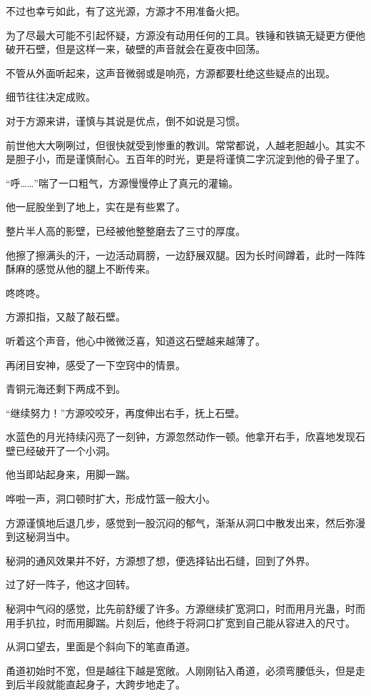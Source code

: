 \begin{this_body}
不过也幸亏如此，有了这光源，方源才不用准备火把。

为了尽最大可能不引起怀疑，方源没有动用任何的工具。铁锤和铁镐无疑更方便他破开石壁，但是这样一来，破壁的声音就会在夏夜中回荡。

不管从外面听起来，这声音微弱或是响亮，方源都要杜绝这些疑点的出现。

细节往往决定成败。

对于方源来讲，谨慎与其说是优点，倒不如说是习惯。

前世他大大咧咧过，但很快就受到惨重的教训。常常都说，人越老胆越小。其实不是胆子小，而是谨慎耐心。五百年的时光，更是将谨慎二字沉淀到他的骨子里了。

“呼……”喘了一口粗气，方源慢慢停止了真元的灌输。

他一屁股坐到了地上，实在是有些累了。

整片半人高的影壁，已经被他整整磨去了三寸的厚度。

他擦了擦满头的汗，一边活动肩膀，一边舒展双腿。因为长时间蹲着，此时一阵阵酥麻的感觉从他的腿上不断传来。

咚咚咚。

方源扣指，又敲了敲石壁。

听着这个声音，他心中微微泛喜，知道这石壁越来越薄了。

再闭目安神，感受了一下空窍中的情景。

青铜元海还剩下两成不到。

“继续努力！”方源咬咬牙，再度伸出右手，抚上石壁。

水蓝色的月光持续闪亮了一刻钟，方源忽然动作一顿。他拿开右手，欣喜地发现石壁已经破开了一个小洞。

他当即站起身来，用脚一踹。

哗啦一声，洞口顿时扩大，形成竹篮一般大小。

方源谨慎地后退几步，感觉到一股沉闷的郁气，渐渐从洞口中散发出来，然后弥漫到这秘洞当中。

秘洞的通风效果并不好，方源想了想，便选择钻出石缝，回到了外界。

过了好一阵子，他这才回转。

秘洞中气闷的感觉，比先前舒缓了许多。方源继续扩宽洞口，时而用月光蛊，时而用手扒拉，时而用脚踹。片刻后，他终于将洞口扩宽到自己能从容进入的尺寸。

从洞口望去，里面是个斜向下的笔直甬道。

甬道初始时不宽，但是越往下越是宽敞。人刚刚钻入甬道，必须弯腰低头，但是走到后半段就能直起身子，大跨步地走了。


\end{this_body}
